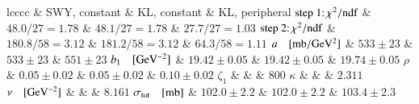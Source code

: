 \begin{tabular}{lcccc}\hline\hline
										& SWY, constant 		& KL, constant 			& KL, peripheral		\cr\hline\hline
$\hbox{step 1:}\, \chi^2/\hbox{ndf}$	& $ 48.0 / 27 = 1.78$	& $ 48.1 / 27 = 1.78$	& $ 27.7 / 27 = 1.03$	\cr
$\hbox{step 2:}\, \chi^2/\hbox{ndf}$	& $ 180.8 / 58 = 3.12$	& $ 181.2 / 58 = 3.12$	& $ 64.3 / 58 = 1.11$	\cr
\hline
$a\quad[{\rm mb/GeV^2}]$				 		& $533 \pm 23$			& $533 \pm 23$			& $551 \pm 23$			\cr
$b_1\quad[{\rm GeV^{-2}}]$				 		& $19.42 \pm  0.05$ 	& $19.42 \pm  0.05$		& $19.74 \pm  0.05$		\cr
\hline
$\rho$							 		& $0.05 \pm  0.02$  	& $0.05 \pm  0.02$		& $0.10 \pm  0.02$		\cr
$\zeta_1$						 		&					 	&					 	& $800$					\cr
$\kappa$						 		&					 	&					 	& $2.311$				\cr
$\nu\quad[{\rm GeV^{-2}}]$				 		&					 	&					 	& $8.161$				\cr
\hline
$\sigma_{\rm tot}\quad[{\rm mb}]$		 		& $102.0 \pm  2.2$		& $102.0 \pm  2.2$		& $103.4 \pm  2.3$		\cr
\hline\hline
\end{tabular}
